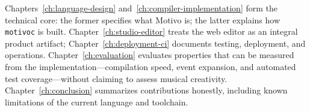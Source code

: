 Chapters~\ref{ch:language-design} and~\ref{ch:compiler-implementation} form the technical core: the former specifies
what Motivo is; the latter explains how \texttt{motivoc} is built.
Chapter~\ref{ch:studio-editor} treats the web editor as an integral product artifact; Chapter~\ref{ch:deployment-ci}
documents testing, deployment, and operations.
Chapter~\ref{ch:evaluation} evaluates properties that can be measured from the implementation---compilation speed,
event expansion, and automated test coverage---without claiming to assess musical creativity.
Chapter~\ref{ch:conclusion} summarizes contributions honestly, including known limitations of the current language and
toolchain.
